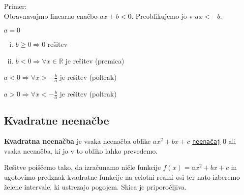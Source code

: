 \documentclass[a4paper,oneside,12pt,fleqn]{article}
\def\R{\ensuremath{\mathbb R}}
\renewcommand\implies\Rightarrow
\numberwithin{equation}{section}
\newenvironment{enumerate*}%
{
\vspace{-12pt}%
\begin{enumerate}%
\setlength{\itemsep}{0pt}%
\setlength{\parskip}{2pt}}%
{\end{enumerate}}
\begin{document}
Primer:\\
Obravnavajmo linearno enačbo $ax+b<0$.
Preoblikujemo jo v $ax<-b$.
\begin{enumerate*}
  \item $a = 0$
    \begin{enumerate}[i.]
      \item $b \ge 0 \implies 0$ rešitev
      \item $b < 0 \implies \forall x \in \R$ je rešitev (premica)
    \end{enumerate}
  \item $a < 0 \implies \forall x > -\frac{b}{a}$ je rešitev (poltrak)
  \item $a > 0 \implies \forall x < -\frac{b}{a}$ je rešitev (poltrak)
\end{enumerate*}

\subsection{Kvadratne neenačbe}
\label{sec:neenac:kvad}
\textbf{Kvadratna neenačba} je vsaka neenačba oblike $ax^2 + bx + c$
\hyperlink{point:neenacaj}{\texttt{neenačaj}} $0$
ali vsaka neenačba, ki jo v to obliko lahko prevedemo.

Rešitve poiščemo tako, da izračunamo ničle funkcije $f(x)
= ax^2 + bx + c$ in ugotovimo predznak kvadratne funkcije na celotni realni osi ter nato 
izberemo želene intervale, ki ustrezajo pogojem. Skica je priporočljiva.
\end{document}
